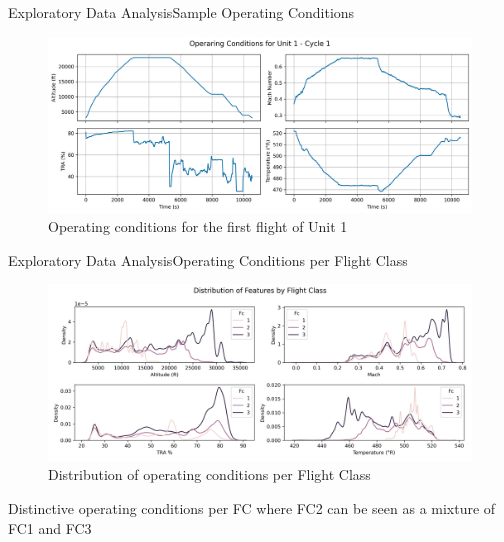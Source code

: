 \documentclass{beamer}
\begin{document}
        \begin{frame}{Exploratory Data Analysis}{Sample Operating Conditions}
            \begin{figure}[!htbp]
                \centering
                \includegraphics[scale=0.35]{operating_conditions_unit_1_cycle_1.png}
                \caption{Operating conditions for the first flight of Unit 1}
            \end{figure}
        \end{frame}

        \begin{frame}{Exploratory Data Analysis}{Operating Conditions per Flight Class}
            \begin{figure}[!htbp]
                \centering
                \includegraphics[scale=0.35]{features_per_condition_fc.png}
                \caption{Distribution of operating conditions per Flight Class}
            \end{figure}

            Distinctive operating conditions per FC where FC2 can be seen as a mixture of FC1 and FC3
        \end{frame}
\end{document}
